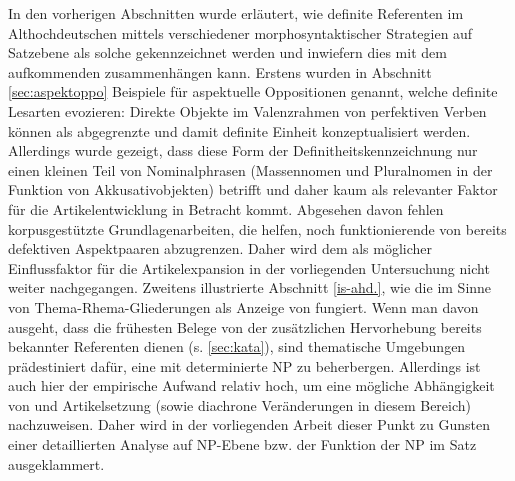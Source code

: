 
In den vorherigen Abschnitten wurde erläutert, wie definite Referenten im Althochdeutschen mittels verschiedener morphosyntaktischer Strategien auf Satzebene als solche gekennzeichnet werden und inwiefern dies mit dem aufkommenden  zusammenhängen kann. Erstens wurden in Abschnitt \ref{sec:aspektoppo} Beispiele für aspektuelle  Oppositionen genannt, welche  definite Lesarten evozieren: Direkte Objekte im Valenzrahmen von perfektiven Verben können als abgegrenzte und damit definite Einheit konzeptualisiert werden. Allerdings wurde gezeigt, dass diese Form der Definitheitskennzeichnung  nur einen kleinen Teil von Nominalphrasen  (Massennomen  und Pluralnomen in der Funktion von  Akkusativobjekten) betrifft und daher kaum als relevanter Faktor für die Artikelentwicklung in Betracht kommt. Abgesehen davon fehlen korpusgestützte Grundlagenarbeiten, die helfen, noch funktionierende von bereits defektiven Aspektpaaren  abzugrenzen. Daher wird dem  als möglicher Einflussfaktor für die Artikelexpansion  in der vorliegenden Untersuchung nicht weiter nachgegangen. Zweitens illustrierte Abschnitt \ref{is-ahd.}, wie die  im Sinne von Thema-Rhema-Gliederungen  als Anzeige von  fungiert. Wenn man davon ausgeht, dass die frühesten Belege von  der zusätzlichen Hervorhebung bereits bekannter Referenten dienen (s. \ref{sec:kata}), sind thematische Umgebungen prädestiniert dafür, eine mit  determinierte NP  zu beherbergen. Allerdings ist auch hier der empirische Aufwand relativ hoch, um eine mögliche Abhängigkeit von  und Artikelsetzung (sowie diachrone Veränderungen in diesem Bereich) nachzuweisen. Daher wird in der vorliegenden Arbeit  dieser Punkt zu Gunsten einer detaillierten Analyse auf NP-Ebene bzw. der Funktion der NP  im Satz ausgeklammert.

